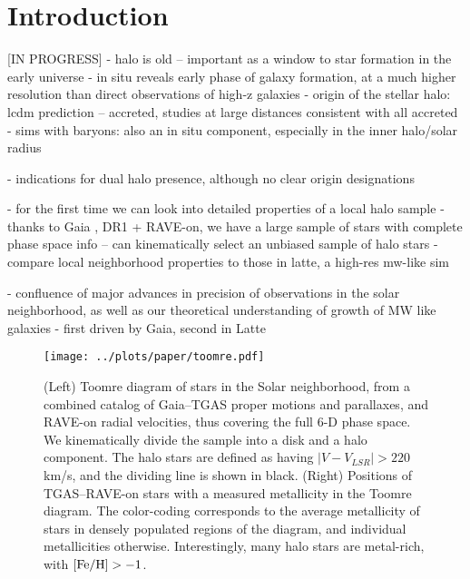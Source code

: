 \documentclass[apj, twocolappendix, numberedappendix, appendixfloats]{emulateapj}
\begin{document}
\section{Introduction}
[IN PROGRESS]
- halo is old -- important as a window to star formation in the early universe
- in situ reveals early phase of galaxy formation, at a much higher resolution than direct observations of high-z galaxies
- origin of the stellar halo: lcdm prediction -- accreted, studies at large distances consistent with all accreted
- sims with baryons: also an in situ component, especially in the inner halo/solar radius

- indications for dual halo presence, although no clear origin designations

- for the first time we can look into detailed properties of a local halo sample
- thanks to Gaia \citep{perryman2001}, DR1 + RAVE-on, we have a large sample of stars with complete phase space info -- can kinematically select an unbiased sample of halo stars
- compare local neighborhood properties to those in latte, a high-res mw-like sim

- confluence of major advances in precision of observations in the solar neighborhood, as well as our theoretical understanding of growth of MW like galaxies
- first driven by Gaia, second in Latte


\begin{figure*}
\begin{center}
\texttt{[image: ../plots/paper/toomre.pdf]}
\caption{(Left) Toomre diagram of stars in the Solar neighborhood, from a combined catalog of Gaia--TGAS proper motions and parallaxes, and RAVE-on radial velocities, thus covering the full 6-D phase space.
We kinematically divide the sample into a disk and a halo component.
The halo stars are defined as having $|V-V_{LSR}|>220$\,km/s, and the dividing line is shown in black.
(Right) Positions of TGAS--RAVE-on stars with a measured metallicity in the Toomre diagram.
The color-coding corresponds to the average metallicity of stars in densely populated regions of the diagram, and individual metallicities otherwise.
Interestingly, many halo stars are metal-rich, with $\rm[Fe/H]>-1$.}
\label{fig:toomre}
\end{center}
\end{figure*}
\end{document}
